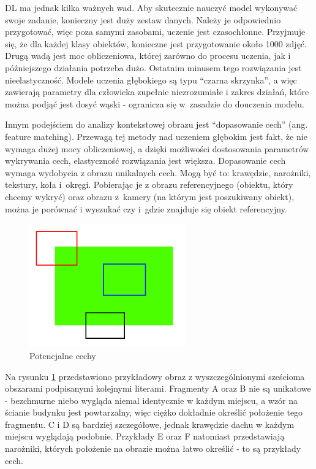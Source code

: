 \documentclass[12pt,twoside,polish]{article}
\begin{document}
DL ma jednak kilka ważnych wad. Aby skutecznie nauczyć model wykonywać swoje zadanie, konieczny jest duży zestaw danych. Należy je odpowiednio przygotować, więc poza samymi zasobami, uczenie jest czasochłonne. Przyjmuje się, że dla każdej klasy obiektów, konieczne jest przygotowanie około 1000 zdjęć. Drugą wadą jest moc obliczeniowa, której zarówno do procesu uczenia, jak i późniejszego działania potrzeba dużo. Ostatnim minusem tego rozwiązania jest nieelastyczność. Modele uczenia głębokiego są typu \enquote{czarna skrzynka}, a więc zawierają parametry dla człowieka zupełnie niezrozumiałe i zakres działań, które można podjąć jest dosyć wąski - ogranicza się w~zasadzie do douczenia modelu.

Innym podejściem do analizy kontekstowej obrazu jest \enquote{dopasowanie cech} (ang. feature matching). Przewagą tej metody nad uczeniem głębokim jest fakt, że nie wymaga dużej mocy obliczeniowej, a dzięki możliwości dostosowania parametrów wykrywania cech, elastyczność rozwiązania jest większa. Dopasowanie cech wymaga wydobycia z obrazu unikalnych cech. Mogą być to: krawędzie, narożniki, tekstury, koła i~okręgi. Pobierając je z obrazu referencyjnego (obiektu, który chcemy wykryć) oraz obrazu z~kamery (na którym jest poszukiwany obiekt), można je porównać i wyszukać czy i~gdzie znajduje się obiekt referencyjny. 

\begin{figure}[h]
	\centering
	\includegraphics[width=0.6\textwidth]{features}
	\caption{Potencjalne cechy \cite{features}}
	\label{features}
\end{figure}

Na rysunku \ref{features} przedstawiono przykładowy obraz z wyszczególnionymi sześcioma obszarami podpisanymi kolejnymi literami. Fragmenty A oraz B nie są unikatowe - bezchmurne niebo wygląda niemal identycznie w każdym miejscu, a wzór na ścianie budynku jest powtarzalny, więc ciężko dokładnie określić położenie tego fragmentu. C i D są bardziej szczegółowe, jednak krawędzie dachu w każdym miejscu wyglądają podobnie. Przykłady E oraz F natomiast przedstawiają narożniki, których położenie na obrazie można łatwo określić - to są przykłady cech.
\end{document}
